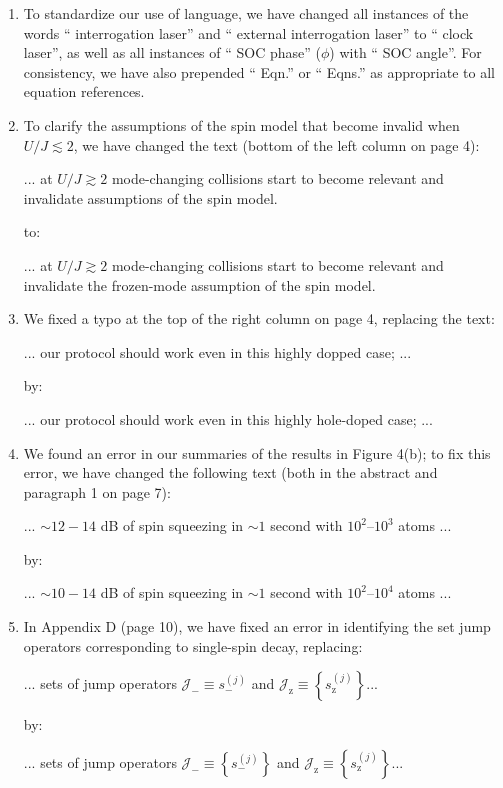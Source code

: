 \documentclass[reprint,onecolumn,12pt]{revtex4-2}
\renewcommand{\set}[1]{\left\{#1\right\}} %
\newcommand{\J}{\mathcal{J}}
\newcommand{\z}{\text{z}}
\newcommand{\red}[1]{{\color{red} #1}}
\newcommand{\green}[1]{{\color{ForestGreen} #1}}
\begin{document}
\begin{enumerate}[label=(M.\arabic*)]
\item To standardize our use of language, we have changed all
  instances of the words ``\red{interrogation laser}'' and
  ``\red{external interrogation laser}'' to ``\green{clock laser}'',
  as well as all instances of ``\red{SOC phase}'' ($\phi$) with
  ``\green{SOC angle}''.  For consistency, we have also prepended
  ``\green{Eqn.}'' or ``\green{Eqns.}'' as appropriate to all equation
  references.


\item To clarify the assumptions of the spin model that become invalid
  when $U/J\lesssim2$, we have changed the text (bottom of the left
  column on page 4):

  \red{... at $U/J\gtrsim2$ mode-changing collisions start to
    become relevant and invalidate assumptions of the spin model.}

  to:

  \green{... at $U/J\gtrsim2$ mode-changing collisions start to become
    relevant and invalidate the frozen-mode assumption of the spin
    model.}


\item We fixed a typo at the top of the right column on page 4,
  replacing the text:

  \red{... our protocol should work even in this highly dopped case;
    ...}

  by:

  \green{... our protocol should work even in this highly hole-doped
    case; ...}


\item We found an error in our summaries of the results in Figure
  4(b); to fix this error, we have changed the following text (both in
  the abstract and paragraph 1 on page 7):

  \red{... $\sim12-14$ dB of spin squeezing in $\sim1$ second with
    $10^2$--$10^3$ atoms ...}

  by:

  \green{... $\sim10-14$ dB of spin squeezing in $\sim1$ second with
    $10^2$--$10^4$ atoms ...}


\item In Appendix D (page 10), we have fixed an error in identifying
  the set jump operators corresponding to single-spin decay, replacing:

  \red{... sets of jump operators $\J_-\equiv s_-^{(j)}$ and
    $\J_\z\equiv\set{s_\z^{(j)}}$...}

  by:

  \green{... sets of jump operators $\J_-\equiv\set{s_-^{(j)}}$ and
    $\J_\z\equiv\set{s_\z^{(j)}}$...}

\end{enumerate}
\end{document}
